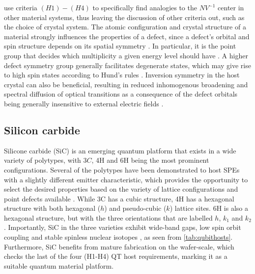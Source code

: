 
\citeauthor{Weber2010} \cite{Weber2010} use criteria $(H1)-(H4)$ to specifically find analogies to the $NV^{-1}$ center in other material systems, thus leaving the discussion of other criteria out, such as the choice of crystal system. The atomic configuration and crystal structure of a material strongly influences the properties of a defect, since a defect's orbital and spin structure depends on its spatial symmetry \cite{Bassett2019}. In particular, it is the point group that decides which multiplicity a given energy level should have \cite{James1976}. A higher defect symmetry group generally facilitates degenerate states, which may give rise to high spin states according to Hund's rules \cite{Bassett2019, Togan2010}. Inversion symmetry in the host crystal can also be beneficial, resulting in reduced inhomogenous broadening and spectral diffusion of optical transitions as a consequence of the defect orbitals being generally insensitive to external electric fields \cite{Bassett2019}.

\subsection{Silicon carbide}
\label{silicon-carbide}

Silicone carbide (SiC) is an emerging quantum platform that exists in a wide variety of polytypes, with $3C$, 4H and 6H being the most prominent configurations. Several of the polytypes have been demonstrated to host SPEs with a slightly different emitter characteristic, which provides the opportunity to select the desired properties based on the variety of lattice configurations and point defects available \cite{Weber2010, Son2020, Falk2013}. While 3C has a cubic structure, 4H has a hexagonal structure with both hexagonal ($h$) and pseudo-cubic ($k$) lattice sites. 6H is also a hexagonal structure, but with the three orientations that are labelled $h$, $k_1$ and $k_2$. Importantly, SiC in the three varieties exhibit wide-band gaps, low spin orbit coupling and stable spinless nuclear isotopes \cite{Neudeck1995, Weber2010, Martienssen2005}, as seen from \autoref{tab:qubithosts}. Furthermore, SiC benefits from mature fabrication on the wafer-scale, which checks the last of the four (H1-H4) QT host requirements, marking it as a suitable quantum material platform.

